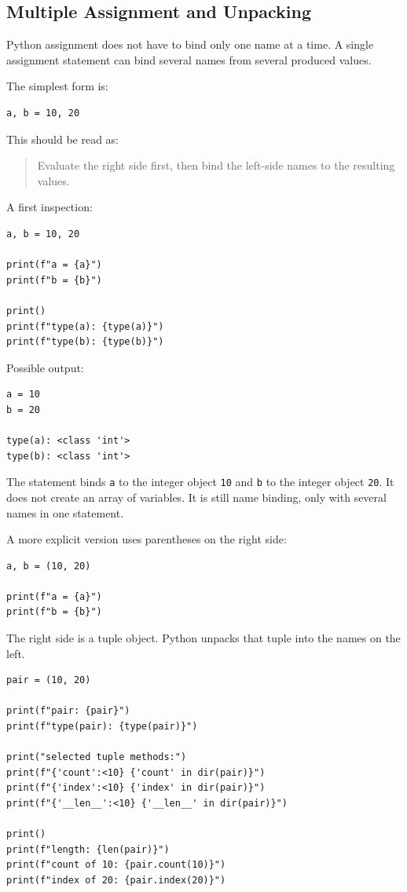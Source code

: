 \subsection{Multiple Assignment and Unpacking}

Python assignment does not have to bind only one name at a time. A single assignment statement can bind several names from several produced values.

The simplest form is:

\begin{verbatim}
a, b = 10, 20
\end{verbatim}

This should be read as:

\begin{quote}
Evaluate the right side first, then bind the left-side names to the resulting values.
\end{quote}

A first inspection:

\begin{verbatim}
a, b = 10, 20

print(f"a = {a}")
print(f"b = {b}")

print()
print(f"type(a): {type(a)}")
print(f"type(b): {type(b)}")
\end{verbatim}

Possible output:

\begin{verbatim}
a = 10
b = 20

type(a): <class 'int'>
type(b): <class 'int'>
\end{verbatim}

The statement binds \texttt{a} to the integer object \texttt{10} and \texttt{b} to the integer object \texttt{20}. It does not create an array of variables. It is still name binding, only with several names in one statement.

A more explicit version uses parentheses on the right side:

\begin{verbatim}
a, b = (10, 20)

print(f"a = {a}")
print(f"b = {b}")
\end{verbatim}

The right side is a tuple object. Python unpacks that tuple into the names on the left.

\begin{verbatim}
pair = (10, 20)

print(f"pair: {pair}")
print(f"type(pair): {type(pair)}")

print("selected tuple methods:")
print(f"{'count':<10} {'count' in dir(pair)}")
print(f"{'index':<10} {'index' in dir(pair)}")
print(f"{'__len__':<10} {'__len__' in dir(pair)}")

print()
print(f"length: {len(pair)}")
print(f"count of 10: {pair.count(10)}")
print(f"index of 20: {pair.index(20)}")
\end{verbatim}

